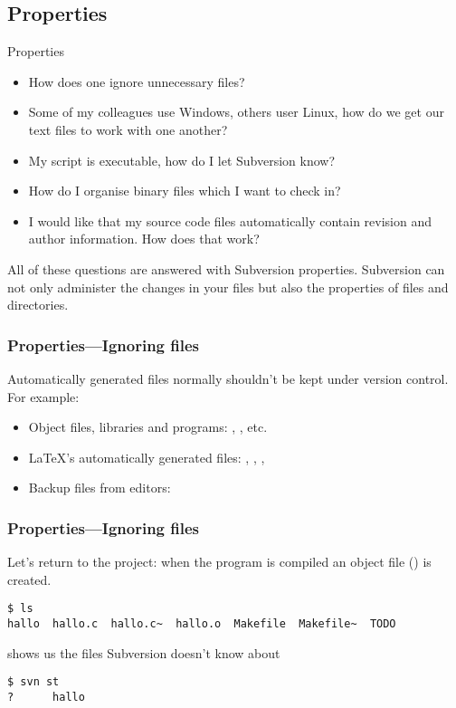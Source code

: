 \subsection{Properties}
\begin{frame}{Properties}
    \begin{itemize}
        \item How does one ignore unnecessary files?
        \item Some of my colleagues use Windows, others user Linux, how do
            we get our text files to work with one another?
        \item My script is executable, how do I let Subversion know?
        \item How do I organise binary files which I want to check in?
        \item I would like that my source code files automatically contain
            revision and author information.  How does that work?
    \end{itemize}

    All of these questions are answered with Subversion properties.
    Subversion can not only administer the changes in your files but also
    the properties of files and directories.
\end{frame}

\begin{frame}[fragile]
    \frametitle{Properties---Ignoring files}
    Automatically generated files normally shouldn't be kept under version
    control.  For example:
    \begin{itemize}
        \item Object files, libraries and programs: ,
            ,  etc.
        \item \LaTeX{}'s automatically generated files: ,
            , , 
        \item Backup files from editors: \ttalert{*\~}
    \end{itemize}
\end{frame}

\begin{frame}[fragile]
    \frametitle{Properties---Ignoring files}
    \linuxframe
    Let's return to the  project: when the program is
    compiled an object file () is created.
\begin{lstlisting}
$ ls
hallo  hallo.c  hallo.c~  hallo.o  Makefile  Makefile~  TODO
\end{lstlisting}

     shows us the files Subversion doesn't know about
\begin{lstlisting}
$ svn st
?      hallo
\end{lstlisting}
\end{frame}

